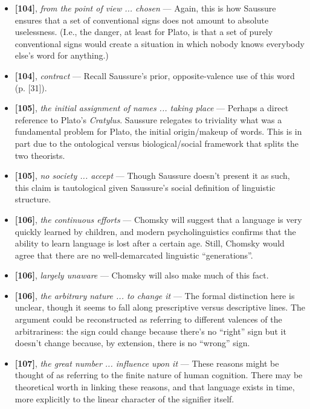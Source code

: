 \documentclass[12pt]{article}
\begin{document}
\begin{itemize}

\item \textbf{[104]}, \textit{from the point of view ... chosen} --- Again, this is how Saussure ensures that a set of conventional signs does not amount to absolute uselessness. (I.e., the danger, at least for Plato, is that a set of purely conventional signs would create a situation in which nobody knows everybody else's word for anything.)

\item \textbf{[104]}, \textit{contract} --- Recall Saussure's prior, opposite-valence use of this word (p. [31]).

\item \textbf{[105]}, \textit{the initial assignment of names ... taking place} --- Perhaps a direct reference to Plato's \textit{Cratylus}.  Saussure relegates to triviality what was a fundamental problem for Plato, the initial origin/makeup of words. This is in part due to the ontological versus biological/social framework that splits the two theorists.

\item \textbf{[105]}, \textit{no society ... accept} --- Though Saussure doesn't present it as such, this claim is tautological given Saussure's social definition of linguistic structure.

\item \textbf{[106]}, \textit{the continuous efforts} --- Chomsky will suggest that a language is very quickly learned by children, and modern psycholinguistics confirms that the ability to learn language is lost after a certain age. Still, Chomsky would agree that there are no well-demarcated linguistic ``generations''.

\item \textbf{[106]}, \textit{largely unaware} --- Chomsky will also make much of this fact.

\item \textbf{[106]}, \textit{the arbitrary nature ... to change it} --- The formal distinction here is unclear, though it seems to fall along prescriptive versus descriptive lines. The argument could be reconstructed as referring to different valences of the arbitrariness: the sign could change because there's no ``right'' sign but it doesn't change because, by extension, there is no ``wrong'' sign.

\item \textbf{[107]}, \textit{the great number ... influence upon it} --- These reasons might be thought of as referring to the finite nature of human cognition. There may be theoretical worth in linking these reasons, and that language exists in time, more explicitly to the linear character of the signifier itself.


\end{itemize}
\end{document}
